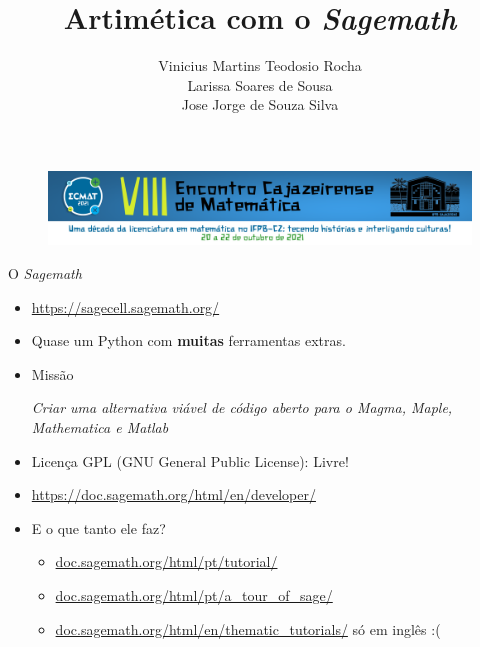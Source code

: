 \documentclass[12pt]{beamer}
\author[]{Vinicius Martins Teodosio Rocha \\ Larissa Soares de Sousa
\\ Jose Jorge de Souza Silva}
\title[]{{\bf{Artimética com o \textit{Sagemath}}}}
\date{}
\institute[IFPB - CZ]{Instituto Federal da Paraíba - Campus Cajazeiras}
\begin{document}
\begin{frame}
 \begin{figure}[t]
 \includegraphics[width=\textwidth]{img/ecmat.png}
 \end{figure}
\titlepage
\end{frame}


\begin{frame}
  {O \textit{Sagemath}}
  \begin{itemize}
    \item \url{https://sagecell.sagemath.org/}
    \item Quase um Python com \textbf{muitas} ferramentas extras.
    \item Missão
    \begin{center}
      \textit{Criar uma alternativa viável de código aberto para o Magma,
      Maple, Mathematica e Matlab}
    \end{center}
    \item Licença GPL (GNU General Public License): Livre!
    \item \url{https://doc.sagemath.org/html/en/developer/}
    \item E o que tanto ele faz?
    \begin{itemize}
      \item \url{doc.sagemath.org/html/pt/tutorial/}
      \item \url{doc.sagemath.org/html/pt/a_tour_of_sage/}
      \item \url{doc.sagemath.org/html/en/thematic_tutorials/} só em inglês :(
    \end{itemize}
  \end{itemize}
\end{frame}
\end{document}
